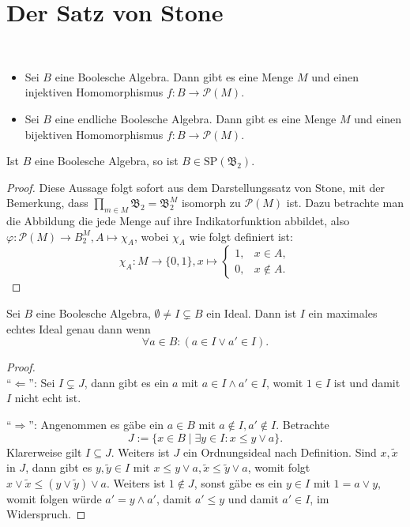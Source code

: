 \section{Der Satz von Stone}

\begin{theorem}{\ }
    \begin{itemize}
        \item Sei $B$ eine Boolesche Algebra. Dann gibt es eine Menge $M$ und einen injektiven Homomorphismus $f : B \to \mathcal{P}(M)$.
        \item Sei $B$ eine endliche Boolesche Algebra. Dann gibt es eine Menge $M$ und einen bijektiven Homomorphismus $f : B \to \mathcal{P}(M)$.
    \end{itemize}
\end{theorem}

\begin{corollary}
    Ist $B$ eine Boolesche Algebra, so ist $B \in \mathrm{SP}(\mathfrak{B}_2)$.
\end{corollary}

\begin{proof}
    Diese Aussage folgt sofort aus dem Darstellungssatz von Stone, mit der Bemerkung, dass $\prod_{m\in M}\mathfrak{B}_2=\mathfrak{B}_2^M$ isomorph zu $\mathcal{P}(M)$ ist. Dazu betrachte man die Abbildung die jede Menge auf ihre Indikatorfunktion abbildet, also $\varphi:\mathcal{P}(M)\to B_2^M, A\mapsto \chi_A$, wobei $\chi_A$ wie folgt definiert ist:$$\chi_A:M\to\{0,1\}, x\mapsto\begin{cases}
        1, & x\in A,\\ 0,& x \not\in A.
    \end{cases}$$
\end{proof}

\begin{lemma}
    Sei $B$ eine Boolesche Algebra, $\emptyset \neq I \subsetneq B$ ein Ideal. Dann ist $I$ ein maximales echtes Ideal genau dann wenn
    $$ \forall a \in B : (a \in I \lor a' \in I). $$
\end{lemma}

\begin{proof}{\ } \\
    ``$\Leftarrow$'': Sei $I \subsetneq J$, dann gibt es ein $a$ mit $a \in I \land a' \in I$, womit $1 \in I$ ist und damit $I$ nicht echt ist.

    ``$\Rightarrow$'': Angenommen es gäbe ein $a \in B$ mit $a \notin I, a' \notin I$. Betrachte
    $$ J := \{ x \in B \mid \exists y \in I: x \leq y \lor a \}. $$
    Klarerweise gilt $I \subseteq J$. Weiters ist $J$ ein Ordnungsideal nach Definition. Sind $x, \widetilde{x}$ in $J$, dann gibt es $y, \widetilde{y} \in I$ mit $x \leq y \lor a, \widetilde{x} \leq \widetilde{y} \lor a$, womit folgt $x \lor \widetilde{x} \leq (y \lor \widetilde{y}) \lor a$. Weiters ist $1 \notin J$, sonst gäbe es ein $y \in I$ mit $1 = a \lor y$, womit folgen würde $a' = y \land a'$, damit $a' \leq y$ und damit $a' \in I$, im Widerspruch.
\end{proof}

